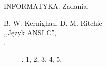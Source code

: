 \documentclass[a4paper,11pt]{article}
\newcommand{\cm}{\checkmark}
\begin{document}
\begin{center}
INFORMATYKA. Zadania.
\end{center}



\begin{center}
B. W. Kernighan, D. M. Ritchie\\
,,Język ANSI C'',\\ \cite{BKDRJAC}.
\end{center}
\begin{itemize}
\item[--] . 1\cm, 2\cm, 3\cm, 4\cm, 5\cm,
\end{itemize}




{}
\end{document}
